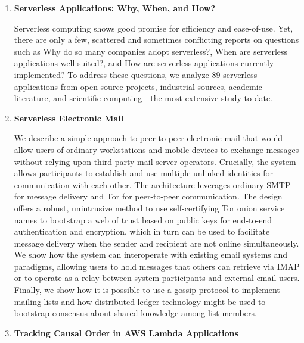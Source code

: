 \begin{enumerate}[wide, labelwidth=!, labelindent=0pt]
    \item \textbf{Serverless Applications: Why, When, and How?} \cite{eismann2020serverless}

  Serverless computing shows good promise for efficiency and ease-of-use. Yet, there are only a few, scattered and sometimes conflicting reports on questions such as Why do so many companies adopt serverless?, When are serverless applications well suited?, and How are serverless applications currently implemented? To address these questions, we analyze 89 serverless applications from open-source projects, industrial sources, academic literature, and scientific computing—the most extensive study to date.     
    \item \textbf{Serverless Electronic Mail } \cite{goodell2020serverless}


  We describe a simple approach to peer-to-peer electronic mail that would allow users of ordinary workstations and mobile devices to exchange messages without relying upon third-party mail server operators. Crucially, the system allows participants to establish and use multiple unlinked identities for communication with each other. The architecture leverages ordinary SMTP \cite{rfc5322} for message delivery and Tor \cite{dingledine2004tor} for peer-to-peer communication. The design offers a robust, unintrusive method to use self-certifying Tor onion service names to bootstrap a web of trust based on public keys for end-to-end authentication and encryption, which in turn can be used to facilitate message delivery when the sender and recipient are not online simultaneously. We show how the system can interoperate with existing email systems and paradigms, allowing users to hold messages that others can retrieve via IMAP \cite{rfc3501}  or to operate as a relay between system participants and external email users. Finally, we show how it is possible to use a gossip protocol to implement mailing lists and how distributed ledger technology might be used to bootstrap consensus about shared knowledge among list members.
    \item \textbf{Tracking Causal Order in AWS Lambda Applications} \cite{lin2018tracking}
    

\end{enumerate}
